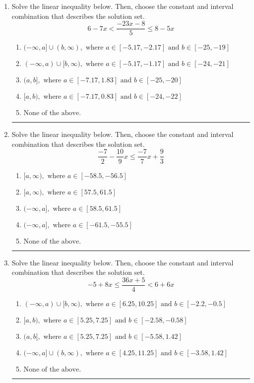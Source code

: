 \documentclass[14pt]{extbook}
\newcommand{\litem}[1]{\item#1\hspace*{-1cm}\rule{\textwidth}{0.4pt}}
\begin{document}
\begin{enumerate}
{\begin{enumerate}[label=\Alph*.]
\end{enumerate} }
\litem{
Solve the linear inequality below. Then, choose the constant and interval combination that describes the solution set.\[ 6 - 7 x < \frac{-23 x - 8}{5} \leq 8 - 5 x \]\begin{enumerate}[label=\Alph*.]
\item \( (-\infty, a] \cup (b, \infty), \text{ where } a \in [-5.17, -2.17] \text{ and } b \in [-25, -19] \)
\item \( (-\infty, a) \cup [b, \infty), \text{ where } a \in [-5.17, -1.17] \text{ and } b \in [-24, -21] \)
\item \( (a, b], \text{ where } a \in [-7.17, 1.83] \text{ and } b \in [-25, -20] \)
\item \( [a, b), \text{ where } a \in [-7.17, 0.83] \text{ and } b \in [-24, -22] \)
\item \( \text{None of the above.} \)

\end{enumerate} }
\litem{
Solve the linear inequality below. Then, choose the constant and interval combination that describes the solution set.\[ \frac{-7}{2} - \frac{10}{9} x \leq \frac{-7}{7} x + \frac{9}{3} \]\begin{enumerate}[label=\Alph*.]
\item \( [a, \infty), \text{ where } a \in [-58.5, -56.5] \)
\item \( [a, \infty), \text{ where } a \in [57.5, 61.5] \)
\item \( (-\infty, a], \text{ where } a \in [58.5, 61.5] \)
\item \( (-\infty, a], \text{ where } a \in [-61.5, -55.5] \)
\item \( \text{None of the above}. \)

\end{enumerate} }
\litem{
Solve the linear inequality below. Then, choose the constant and interval combination that describes the solution set.\[ -5 + 8 x \leq \frac{36 x + 5}{4} < 6 + 6 x \]\begin{enumerate}[label=\Alph*.]
\item \( (-\infty, a) \cup [b, \infty), \text{ where } a \in [6.25, 10.25] \text{ and } b \in [-2.2, -0.5] \)
\item \( [a, b), \text{ where } a \in [5.25, 7.25] \text{ and } b \in [-2.58, -0.58] \)
\item \( (a, b], \text{ where } a \in [5.25, 7.25] \text{ and } b \in [-5.58, 1.42] \)
\item \( (-\infty, a] \cup (b, \infty), \text{ where } a \in [4.25, 11.25] \text{ and } b \in [-3.58, 1.42] \)
\item \( \text{None of the above.} \)


\end{enumerate}}
\end{enumerate}
\end{document}

